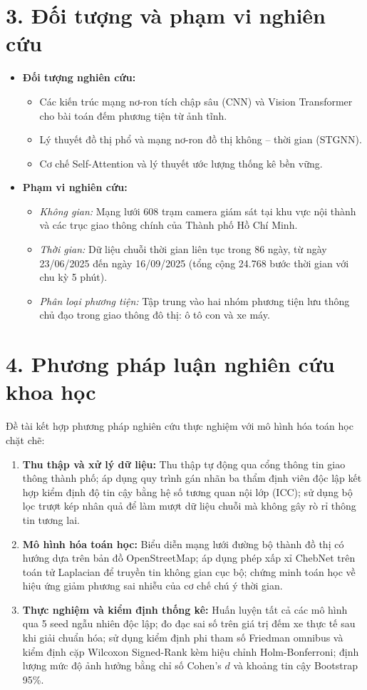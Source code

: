 \section*{3. Đối tượng và phạm vi nghiên cứu}
\begin{itemize}
    \item \textbf{Đối tượng nghiên cứu:}
    \begin{itemize}
        \item Các kiến trúc mạng nơ-ron tích chập sâu (CNN) và Vision Transformer cho bài toán đếm phương tiện từ ảnh tĩnh.
        \item Lý thuyết đồ thị phổ và mạng nơ-ron đồ thị không -- thời gian (STGNN).
        \item Cơ chế Self-Attention và lý thuyết ước lượng thống kê bền vững.

    \end{itemize}
    \item \textbf{Phạm vi nghiên cứu:}
    \begin{itemize}
        \item \textit{Không gian:} Mạng lưới 608 trạm camera giám sát tại khu vực nội thành và các trục giao thông chính của Thành phố Hồ Chí Minh.
        \item \textit{Thời gian:} Dữ liệu chuỗi thời gian liên tục trong 86 ngày, từ ngày 23/06/2025 đến ngày 16/09/2025 (tổng cộng 24.768 bước thời gian với chu kỳ 5 phút).
        \item \textit{Phân loại phương tiện:} Tập trung vào hai nhóm phương tiện lưu thông chủ đạo trong giao thông đô thị: ô tô con và xe máy.
    \end{itemize}
\end{itemize}

\section*{4. Phương pháp luận nghiên cứu khoa học}
Đề tài kết hợp phương pháp nghiên cứu thực nghiệm với mô hình hóa toán học chặt chẽ:
\begin{enumerate}
    \item \textbf{Thu thập và xử lý dữ liệu:} Thu thập tự động qua cổng thông tin giao thông thành phố; áp dụng quy trình gán nhãn ba thẩm định viên độc lập kết hợp kiểm định độ tin cậy bằng hệ số tương quan nội lớp (ICC); sử dụng bộ lọc trượt kép nhân quả để làm mượt dữ liệu chuỗi mà không gây rò rỉ thông tin tương lai.
    \item \textbf{Mô hình hóa toán học:} Biểu diễn mạng lưới đường bộ thành đồ thị có hướng dựa trên bản đồ OpenStreetMap; áp dụng phép xấp xỉ ChebNet trên toán tử Laplacian để truyền tin không gian cục bộ; chứng minh toán học về hiệu ứng giảm phương sai nhiễu của cơ chế chú ý thời gian.
    \item \textbf{Thực nghiệm và kiểm định thống kê:} Huấn luyện tất cả các mô hình qua 5 seed ngẫu nhiên độc lập; đo đạc sai số trên giá trị đếm xe thực tế sau khi giải chuẩn hóa; sử dụng kiểm định phi tham số Friedman omnibus và kiểm định cặp Wilcoxon Signed-Rank kèm hiệu chỉnh Holm-Bonferroni; định lượng mức độ ảnh hưởng bằng chỉ số Cohen's $d$ và khoảng tin cậy Bootstrap 95\%.
\end{enumerate}

